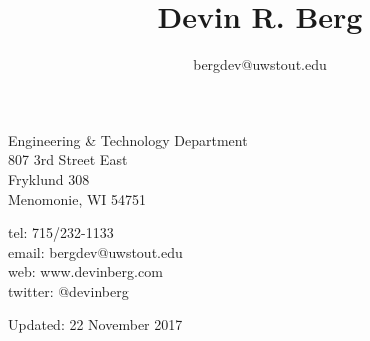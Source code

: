 \documentclass[10pt]{article}
\title{\bfseries\Huge Devin R. Berg}
\author{bergdev@uwstout.edu}
\date{}
\begin{document}
\maketitle
\vspace{1em}
\begin{minipage}[ht]{0.48\textwidth}
Engineering \& Technology Department\\
807 3rd Street East\\
Fryklund 308\\
Menomonie, WI 54751
\end{minipage}
\begin{minipage}[ht]{0.48\textwidth}
\begin{flushright}
tel: 715/232-1133\\
email: bergdev@uwstout.edu\\
web: www.devinberg.com\\
twitter: @devinberg
\end{flushright}
\end{minipage}
\vspace{20pt}






















































\vspace{20pt}
\vspace{20pt}
\scriptsize\hfill Updated: 22 November 2017
\end{document}
